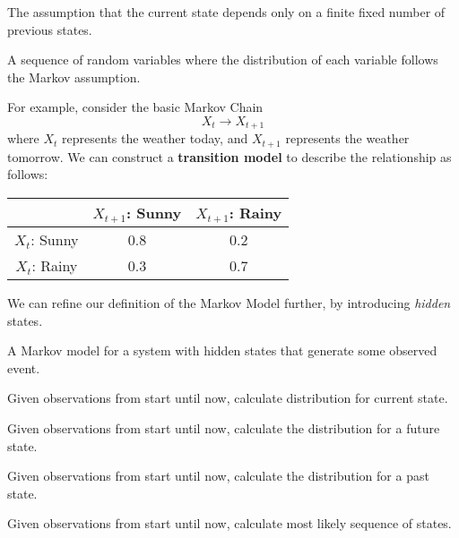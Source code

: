 \begin{definition}
	The assumption that the current state depends only on a finite fixed number of previous states.
\end{definition}

\begin{definition}
	A sequence of random variables where the distribution of each variable follows the Markov assumption.
\end{definition}

For example, consider the basic Markov Chain
\[
	X_t \to X_{t+1}
\]
where \(X_t\) represents the weather today, and \(X_{t+1}\) represents the weather tomorrow. We can construct a \textbf{transition model} to describe the relationship as follows:

\begin{table}[H]
	\centering
	\begin{tabular}{|c|c|c|}
		\hline
			 & \(X_{t+1}\): Sunny & \(X_{t+1}\): Rainy \\
		\hline
			\(X_t\): Sunny & 0.8 & 0.2  \\
			\(X_t\): Rainy & 0.3 & 0.7  \\
		\hline
	\end{tabular}
\end{table}

We can refine our definition of the Markov Model further, by introducing \emph{hidden} states.

\begin{definition}
	A Markov model for a system with hidden states that generate some observed event.
\end{definition}

\begin{definition}[Filtering]
	Given observations from start until now, calculate distribution for current state.
\end{definition}

\begin{definition}[Prediction]
	Given observations from start until now, calculate the distribution for a future state.
\end{definition}

\begin{definition}[Smoothing]
	Given observations from start until now, calculate the distribution for a past state.	
\end{definition}

\begin{definition}
	Given observations from start until now, calculate most likely sequence of states.
\end{definition}